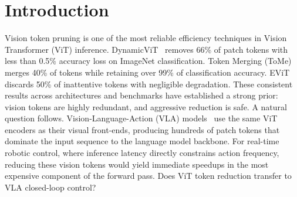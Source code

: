 
\section{Introduction}
\label{sec:introduction}

Vision token pruning is one of the most reliable efficiency techniques in Vision Transformer (ViT) inference.
DynamicViT~\cite{rao2021dynamicvit} removes 66\% of patch tokens with less than 0.5\% accuracy loss on ImageNet classification.
Token Merging (ToMe)~\cite{bolya2023tome} merges 40\% of tokens while retaining over 99\% of classification accuracy.
EViT~\cite{liang2022evit} discards 50\% of inattentive tokens with negligible degradation.
These consistent results across architectures and benchmarks have established a strong prior: vision tokens are highly redundant, and aggressive reduction is safe.
A natural question follows.
Vision-Language-Action (VLA) models~\cite{brohan2023rt2,kim2024openvla,black2024pi0,shukor2025smolvla} use the same ViT encoders as their visual front-ends, producing hundreds of patch tokens that dominate the input sequence to the language model backbone.
For real-time robotic control, where inference latency directly constrains action frequency, reducing these vision tokens would yield immediate speedups in the most expensive component of the forward pass.
Does ViT token reduction transfer to VLA closed-loop control?

